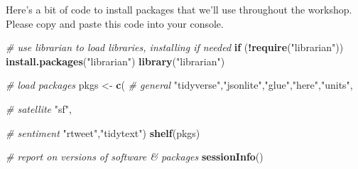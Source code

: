 \documentclass[]{book}
\newenvironment{Shaded}{\begin{snugshade}}{\end{snugshade}}
\newcommand{\CommentTok}[1]{\textcolor[rgb]{0.56,0.35,0.01}{\textit{#1}}}
\newcommand{\ControlFlowTok}[1]{\textcolor[rgb]{0.13,0.29,0.53}{\textbf{#1}}}
\newcommand{\KeywordTok}[1]{\textcolor[rgb]{0.13,0.29,0.53}{\textbf{#1}}}
\newcommand{\NormalTok}[1]{#1}
\newcommand{\OperatorTok}[1]{\textcolor[rgb]{0.81,0.36,0.00}{\textbf{#1}}}
\newcommand{\StringTok}[1]{\textcolor[rgb]{0.31,0.60,0.02}{#1}}
\begin{document}
Here's a bit of code to install packages that we'll use throughout the workshop. Please copy and paste this code into your console.

\begin{Shaded}
\begin{Highlighting}[]
\CommentTok{# use librarian to load libraries, installing if needed}
\ControlFlowTok{if}\NormalTok{ (}\OperatorTok{!}\KeywordTok{require}\NormalTok{(}\StringTok{"librarian"}\NormalTok{)) }\KeywordTok{install.packages}\NormalTok{(}\StringTok{"librarian"}\NormalTok{)}
\KeywordTok{library}\NormalTok{(}\StringTok{"librarian"}\NormalTok{)}

\CommentTok{# load packages}
\NormalTok{pkgs <-}\StringTok{ }\KeywordTok{c}\NormalTok{(}
  \CommentTok{# general}
  \StringTok{"tidyverse"}\NormalTok{,}\StringTok{"jsonlite"}\NormalTok{,}\StringTok{"glue"}\NormalTok{,}\StringTok{"here"}\NormalTok{,}\StringTok{"units"}\NormalTok{,}

  \CommentTok{# satellite}
  \StringTok{"sf"}\NormalTok{,}
  
  \CommentTok{# sentiment}
  \StringTok{"rtweet"}\NormalTok{,}\StringTok{"tidytext"}\NormalTok{)}
\KeywordTok{shelf}\NormalTok{(pkgs)}

\CommentTok{# report on versions of software & packages}
\KeywordTok{sessionInfo}\NormalTok{()}
\end{Highlighting}
\end{Shaded}
\end{document}
